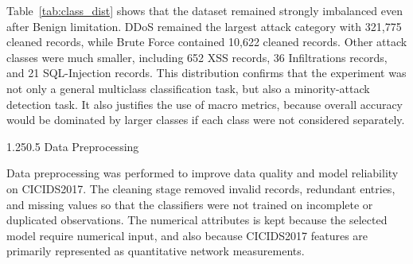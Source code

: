 \documentclass[12pt,a4paper]{article}
\makeatletter
\renewcommand{\subsection}{\@startsection{subsection}{2}{0pt}%
  {1.25\baselineskip}{0.5\baselineskip}%
  {\normalfont\fontsize{13}{15.6}\selectfont\bfseries}}
\makeatother
\begin{document}
\begin{table}[H]
\caption{Class Distribution Across Main Processing Stages}
\label{tab:class_dist}
\centering
\scriptsize
\renewcommand{\arraystretch}{1.15}
\setlength{\tabcolsep}{3pt}
\caption*{\textit{Note.} Train After refers to the training partition after SMOTE-Tomek resampling.}
\end{table}

Table~\ref{tab:class_dist} shows that the dataset remained strongly imbalanced even after Benign limitation. DDoS remained the largest attack category with 321,775 cleaned records, while Brute Force contained 10,622 cleaned records. Other attack classes were much smaller, including 652 XSS records, 36 Infiltrations records, and 21 SQL-Injection records. This distribution confirms that the experiment was not only a general multiclass classification task, but also a minority-attack detection task. It also justifies the use of macro metrics, because overall accuracy would be dominated by larger classes if each class were not considered separately.

\subsection{Data Preprocessing}

Data preprocessing was performed to improve data quality and model reliability on CICIDS2017. The cleaning stage removed invalid records, redundant entries, and missing values so that the classifiers were not trained on incomplete or duplicated observations. The numerical attributes is kept because the selected model require numerical input, and also because CICIDS2017 features are primarily represented as quantitative network measurements.
\end{document}
